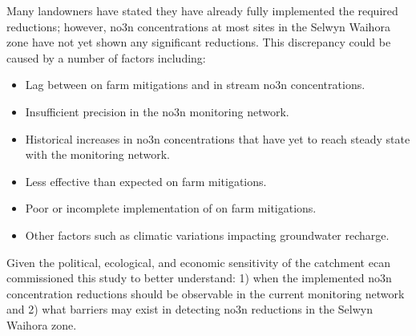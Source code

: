 Many landowners have stated they have already fully implemented the required reductions; %
however, \gls{no3n} concentrations at most sites in the Selwyn Waihora zone have not yet shown any significant reductions. %
This discrepancy could be caused by a number of factors including:
\begin{itemize}
    \item Lag between on farm mitigations and in stream \gls{no3n} concentrations.
    \item Insufficient precision in the \gls{no3n} monitoring network.
    \item Historical increases in \gls{no3n} concentrations that have yet to reach steady state with the monitoring network.
    \item Less effective than expected on farm mitigations.
    \item Poor or incomplete implementation of on farm mitigations.
    \item Other factors such as climatic variations impacting groundwater recharge.
\end{itemize}
Given the political, ecological, and economic sensitivity of the catchment \gls{ecan} commissioned this study to better understand: 1) when the implemented \gls{no3n} concentration reductions should be observable in the current monitoring network and 2) what barriers may exist in detecting \gls{no3n} reductions in the Selwyn Waihora zone.
